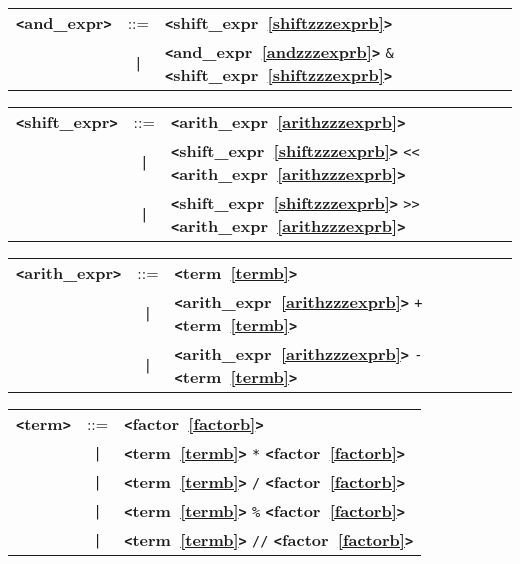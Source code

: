 \documentclass[12pt]{article}
\begin{document}
\label{andzzzexprb}
\begin{tabular}{lcl}
{\bf \verb+<+and\_expr\verb+>+} & ::=  & {\bf \verb+<+shift\_expr~\ref{shiftzzzexprb}\verb+>+}  \\
 & \verb+|+  & {\bf \verb+<+and\_expr~\ref{andzzzexprb}\verb+>+}  \verb|&| {\bf \verb+<+shift\_expr~\ref{shiftzzzexprb}\verb+>+}  \\
\end{tabular}

\label{shiftzzzexprb}
\begin{tabular}{lcl}
{\bf \verb+<+shift\_expr\verb+>+} & ::=  & {\bf \verb+<+arith\_expr~\ref{arithzzzexprb}\verb+>+}  \\
 & \verb+|+  & {\bf \verb+<+shift\_expr~\ref{shiftzzzexprb}\verb+>+}  \verb|<<| {\bf \verb+<+arith\_expr~\ref{arithzzzexprb}\verb+>+}  \\
 & \verb+|+  & {\bf \verb+<+shift\_expr~\ref{shiftzzzexprb}\verb+>+}  \verb|>>| {\bf \verb+<+arith\_expr~\ref{arithzzzexprb}\verb+>+}  \\
\end{tabular}

\label{arithzzzexprb}
\begin{tabular}{lcl}
{\bf \verb+<+arith\_expr\verb+>+} & ::=  & {\bf \verb+<+term~\ref{termb}\verb+>+}  \\
 & \verb+|+  & {\bf \verb+<+arith\_expr~\ref{arithzzzexprb}\verb+>+}  \verb|+| {\bf \verb+<+term~\ref{termb}\verb+>+}  \\
 & \verb+|+  & {\bf \verb+<+arith\_expr~\ref{arithzzzexprb}\verb+>+}  \verb|-| {\bf \verb+<+term~\ref{termb}\verb+>+}  \\
\end{tabular}

\label{termb}
\begin{tabular}{lcl}
{\bf \verb+<+term\verb+>+} & ::=  & {\bf \verb+<+factor~\ref{factorb}\verb+>+}  \\
 & \verb+|+  & {\bf \verb+<+term~\ref{termb}\verb+>+}  \verb|*| {\bf \verb+<+factor~\ref{factorb}\verb+>+}  \\
 & \verb+|+  & {\bf \verb+<+term~\ref{termb}\verb+>+}  \verb|/| {\bf \verb+<+factor~\ref{factorb}\verb+>+}  \\
 & \verb+|+  & {\bf \verb+<+term~\ref{termb}\verb+>+}  \verb|%| {\bf \verb+<+factor~\ref{factorb}\verb+>+}  \\
 & \verb+|+  & {\bf \verb+<+term~\ref{termb}\verb+>+}  \verb|//| {\bf \verb+<+factor~\ref{factorb}\verb+>+}  \\
\end{tabular}
\end{document}
